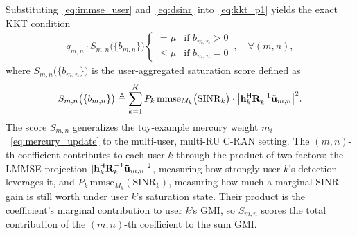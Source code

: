 \documentclass[10pt, twocolumn, comsoc]{IEEEtran}
\begin{document}
Substituting~\eqref{eq:immse_user} 
and~\eqref{eq:dsinr} into~\eqref{eq:kkt_p1} yields the 
exact KKT condition
\begin{align} \label{eq:kkt_p1_exact}
  q_{m,n} \cdot S_{m,n}\big(\{b_{m,n}\}\big) 
  \begin{cases}
       = \mu & \text{if } b_{m,n} > 0 \\
       \leq \mu & \text{if } b_{m,n} = 0
  \end{cases}\,,
  \quad \forall (m, n),
\end{align}
where $S_{m,n}\big(\{b_{m,n}\}\big) $ is the user-aggregated saturation score defined as
\begin{align} \label{eq:score_def}
  S_{m,n}\big(\{b_{m,n}\}\big) 
  \triangleq \sum_{k=1}^{K} 
    P_k \, \mathrm{mmse}_{M_k}\big(\mathrm{SINR}_k\big) 
    \cdot \big|\mathbf{h}_k^{\sf H} 
                \mathbf{R}_k^{-1} 
                \mathbf{\tilde u}_{m,n}\big|^2.
\end{align}
The score $S_{m,n}$ generalizes the toy-example mercury weight $m_i$~\eqref{eq:mercury_update}
to the multi-user, multi-RU C-RAN setting.
The $(m,n)$-th coefficient contributes to each user $k$ through the product of two factors: the LMMSE projection $|\mathbf{h}_k^{\sf H}\mathbf{R}_k^{-1}\mathbf{\tilde u}_{m,n}|^2$, measuring how strongly user $k$'s detection leverages it, and $P_k\,\mathrm{mmse}_{M_k}(\mathrm{SINR}_k)$, measuring how much a marginal SINR gain is still worth under user $k$'s saturation state.
Their product is the coefficient's marginal contribution to user $k$'s GMI, so $S_{m,n}$ scores the total contribution of the $(m,n)$-th coefficient to the sum GMI.
\end{document}
